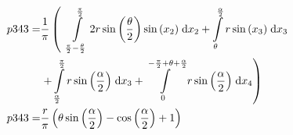 \begin{align}
    p343 =&\frac{1}{\pi} \left(\;\;\int\limits_{\frac{\pi}{2} - \frac{\theta}{2}}^{\frac{\pi}{2}}2 r \sin{\left (\frac{\theta}{2} \right )} \sin{\left (x_{2} \right )}\;\mathrm{d}x_{2}+\int\limits_{\theta}^{\frac{\alpha}{2}}r \sin{\left (x_{3} \right )}\;\mathrm{d}x_{3}\right.\notag\\
 &\left.+\int\limits_{\frac{\alpha}{2}}^{\frac{\pi}{2}}r \sin{\left (\frac{\alpha}{2} \right )}\;\mathrm{d}x_{3}+\int\limits_{0}^{- \frac{\pi}{2} + \theta + \frac{\alpha}{2}}r \sin{\left (\frac{\alpha}{2} \right )}\;\mathrm{d}x_{4}\right)\label{p343Def}\\
    p343 =& \frac{r}{\pi} \left(\theta \sin{\left (\frac{\alpha}{2} \right )} - \cos{\left (\frac{\alpha}{2} \right )} + 1\right)\label{p343Sln}
\end{align}